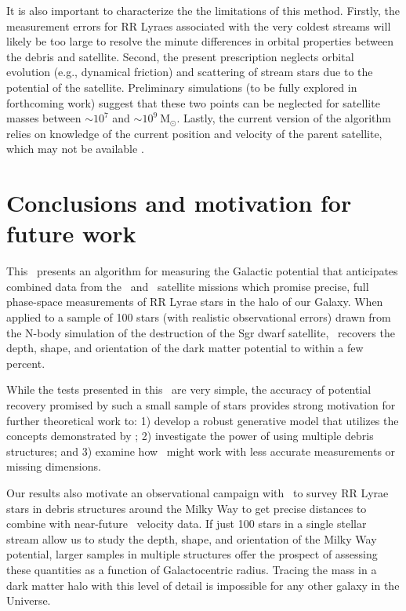 It is also important to characterize the the limitations of this method.
Firstly, the measurement errors for RR Lyraes associated with the very coldest
streams \citep[e.g., the globular clusters Pal5 and GD1;][]{odenkirchen02,
koposov10} will likely be too large to resolve the minute differences in orbital
properties between the debris and satellite. Second, the present prescription
neglects orbital evolution (e.g., dynamical friction) and scattering of stream
stars due to the potential of the satellite. Preliminary simulations (to be
fully explored in forthcoming work) suggest that these two points can be
neglected for satellite masses between $\sim$$10^7$ and
$\sim$$10^9~\mathrm{M}_{\odot}$. Lastly, the current version of the algorithm
relies on knowledge of the current position and velocity of the parent
satellite, which may not be available \citep[e.g., the Orphan
Stream;][]{belokurov07}.

\section{Conclusions and motivation for future work}
\label{sec:conclusion}

This \article\ presents an algorithm for measuring the Galactic potential that
anticipates combined data from the \spitzer\ and \gaia\ satellite
missions which promise precise, full phase-space measurements of RR Lyrae stars
in the halo of our Galaxy. When applied to a sample of 100 stars (with realistic
observational errors) drawn from the \cite{law10} N-body simulation of the
destruction of the Sgr dwarf satellite, \rewinder\ recovers the depth,
shape, and orientation of the dark matter potential to within a few percent.

While the tests presented in this \article\ are very simple, the accuracy of
potential recovery promised by such a small sample of stars provides strong
motivation for further theoretical work to: 1) develop a robust generative model
that utilizes the concepts demonstrated by \rewinder; 2) investigate the
power of using multiple debris structures; and 3) examine how \rewinder\
might work with less accurate measurements or missing dimensions.

Our results also motivate an observational campaign with \spitzer\ to survey
RR Lyrae stars in debris structures around the Milky Way to get precise
distances to combine with near-future \gaia\ velocity data. If just 100
stars in a single stellar stream allow us to study the depth, shape, and
orientation of the Milky Way potential, larger samples in multiple structures
\citep[e.g., the Orphan Stream;][]{sesar13b} offer the prospect of assessing
these quantities as a function of Galactocentric radius. Tracing the mass in a
dark matter halo with this level of detail is impossible for any other galaxy in
the Universe.


